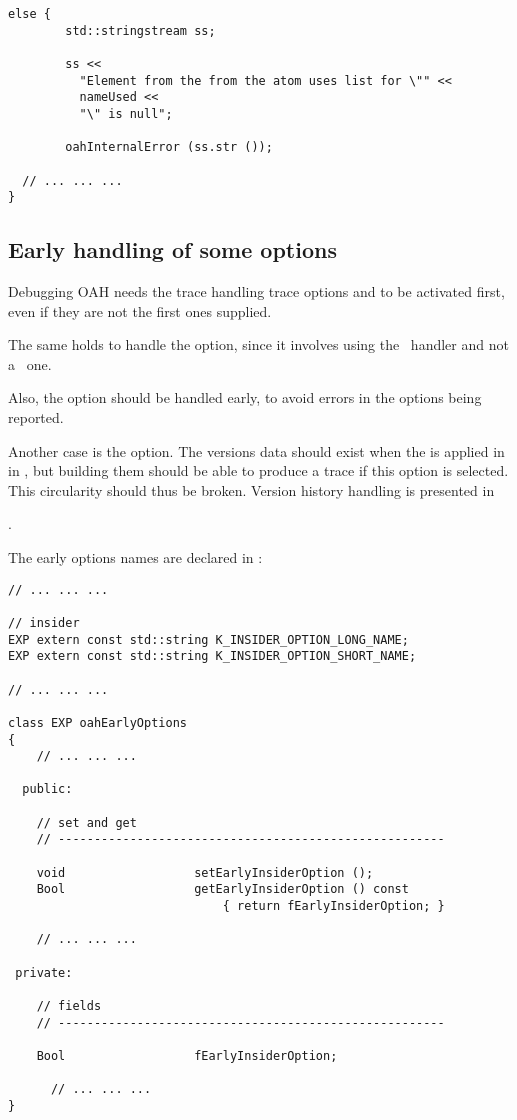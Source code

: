 {\begin{lstlisting}[language=CPlusPlus]
      else {
        std::stringstream ss;

        ss <<
          "Element from the from the atom uses list for \"" <<
          nameUsed <<
          "\" is null";

        oahInternalError (ss.str ());

  // ... ... ...
}
\end{lstlisting}


\subsection{Early handling of some options}

Debugging OAH needs the trace handling trace options  and  to be activated first, even if they are not the first ones supplied.

The same holds to handle the  option, since it involves using the \insider\ handler and not a \regular\ one.

Also, the  option should be handled early, to avoid errors in the options being reported.

Another case is the  option. The versions data should exist when the  is applied in  in , but building them should be able to produce a trace if this option is selected. This circularity  should thus be broken. Version history handling is presented in }.

The early options names are declared in :
\begin{lstlisting}[language=Terminal]
// ... ... ...

// insider
EXP extern const std::string K_INSIDER_OPTION_LONG_NAME;
EXP extern const std::string K_INSIDER_OPTION_SHORT_NAME;

// ... ... ...

class EXP oahEarlyOptions
{
	// ... ... ...

  public:

    // set and get
    // ------------------------------------------------------

    void                  setEarlyInsiderOption ();
    Bool                  getEarlyInsiderOption () const
                              { return fEarlyInsiderOption; }

	// ... ... ...

 private:

    // fields
    // ------------------------------------------------------

    Bool                  fEarlyInsiderOption;

	  // ... ... ...
}
\end{lstlisting}


